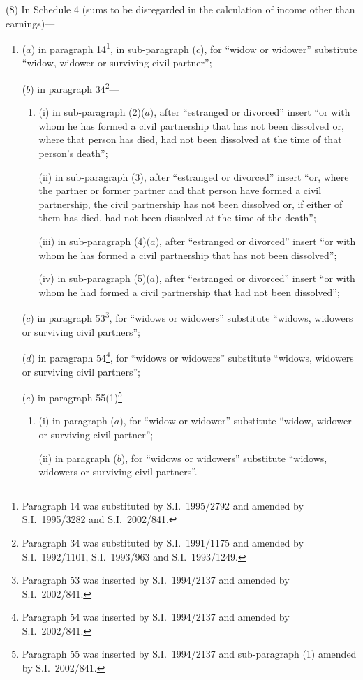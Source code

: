 \documentclass[12pt,a4paper]{article}
\begin{document}
(8) In Schedule 4 (sums to be disregarded in the calculation of income other than earnings)—
\begin{enumerate}\item[]
($a$) in paragraph 14\footnote{Paragraph 14 was substituted by S.I.\ 1995/2792 and amended by S.I.\ 1995/3282 and S.I.\ 2002/841.}, in sub-paragraph ($c$), for “widow or widower” substitute “widow, widower or surviving civil partner”;

($b$) in paragraph 34\footnote{Paragraph 34 was substituted by S.I.\ 1991/1175 and amended by S.I.\ 1992/1101, S.I.\ 1993/963 and S.I.\ 1993/1249.}—
\begin{enumerate}\item[]
(i) in sub-paragraph (2)($a$), after “estranged or divorced” insert “or with whom he has formed a civil partnership that has not been dissolved or, where that person has died, had not been dissolved at the time of that person’s death”;

(ii) in sub-paragraph (3), after “estranged or divorced” insert “or, where the partner or former partner and that person have formed a civil partnership, the civil partnership has not been dissolved or, if either of them has died, had not been dissolved at the time of the death”;

(iii) in sub-paragraph (4)($a$), after “estranged or divorced” insert “or with whom he has formed a civil partnership that has not been dissolved”;

(iv) in sub-paragraph (5)($a$), after “estranged or divorced” insert “or with whom he had formed a civil partnership that had not been dissolved”;
\end{enumerate}

($c$) in paragraph 53\footnote{Paragraph 53 was inserted by S.I.\ 1994/2137 and amended by S.I.\ 2002/841.}, for “widows or widowers” substitute “widows, widowers or surviving civil partners”;

($d$) in paragraph 54\footnote{Paragraph 54 was inserted by S.I.\ 1994/2137 and amended by S.I.\ 2002/841.}, for “widows or widowers” substitute “widows, widowers or surviving civil partners”;

($e$) in paragraph 55(1)\footnote{Paragraph 55 was inserted by S.I.\ 1994/2137 and sub-paragraph (1) amended by S.I.\ 2002/841.}—
\begin{enumerate}\item[]
(i) in paragraph ($a$), for “widow or widower” substitute “widow, widower or surviving civil partner”;

(ii) in paragraph ($b$), for “widows or widowers” substitute “widows, widowers or surviving civil partners”.
\end{enumerate}
\end{enumerate}
\end{document}
